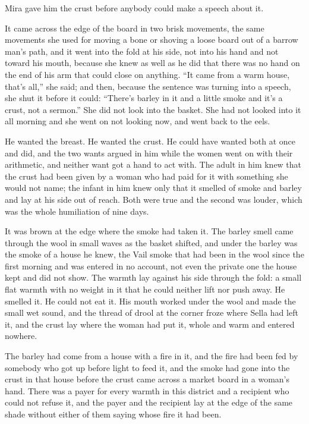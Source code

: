 \scenebreak

Mira gave him the crust before anybody could make a speech about it.

It came across the edge of the board in two brisk movements, the same movements she used for moving a bone or shoving a loose board out of a barrow man's path, and it went into the fold at his side, not into his hand and not toward his mouth, because she knew as well as he did that there was no hand on the end of his arm that could close on anything. “It came from a warm house, that's all,” she said; and then, because the sentence was turning into a speech, she shut it before it could: “There's barley in it and a little smoke and it's a crust, not a sermon.” She did not look into the basket. She had not looked into it all morning and she went on not looking now, and went back to the eels.

He wanted the breast. He wanted the crust. He could have wanted both at once and did, and the two wants argued in him while the women went on with their arithmetic, and neither want got a hand to act with. The adult in him knew that the crust had been given by a woman who had paid for it with something she would not name; the infant in him knew only that it smelled of smoke and barley and lay at his side out of reach. Both were true and the second was louder, which was the whole humiliation of nine days.

It was brown at the edge where the smoke had taken it. The barley smell came through the wool in small waves as the basket shifted, and under the barley was the smoke of a house he knew, the Vail smoke that had been in the wool since the first morning and was entered in no account, not even the private one the house kept and did not show. The warmth lay against his side through the fold: a small flat warmth with no weight in it that he could neither lift nor push away. He smelled it. He could not eat it. His mouth worked under the wool and made the small wet sound, and the thread of drool at the corner froze where Sella had left it, and the crust lay where the woman had put it, whole and warm and entered nowhere.

The barley had come from a house with a fire in it, and the fire had been fed by somebody who got up before light to feed it, and the smoke had gone into the crust in that house before the crust came across a market board in a woman's hand. There was a payer for every warmth in this district and a recipient who could not refuse it, and the payer and the recipient lay at the edge of the same shade without either of them saying whose fire it had been.

